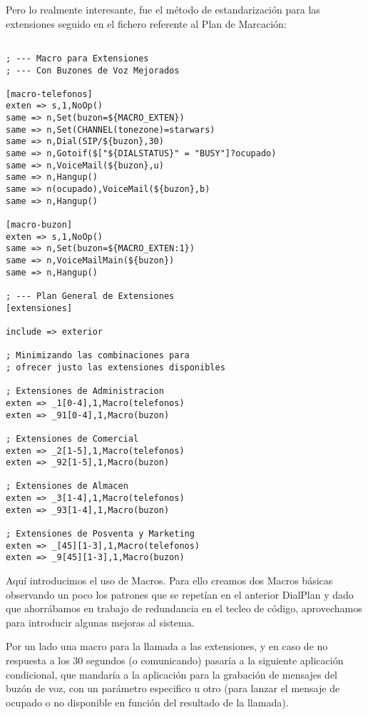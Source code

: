 Pero lo realmente interesante, fue el método de estandarización para las extensiones seguido en el fichero referente al Plan de Marcación:

\begin{lstlisting}[style=bash,title={/etc/asterisk/extensions.conf}]

; --- Macro para Extensiones
; --- Con Buzones de Voz Mejorados

[macro-telefonos]
exten => s,1,NoOp()
same => n,Set(buzon=${MACRO_EXTEN})
same => n,Set(CHANNEL(tonezone)=starwars)
same => n,Dial(SIP/${buzon},30)
same => n,Gotoif($["${DIALSTATUS}" = "BUSY"]?ocupado)
same => n,VoiceMail(${buzon},u)
same => n,Hangup()
same => n(ocupado),VoiceMail(${buzon},b)
same => n,Hangup()

[macro-buzon]
exten => s,1,NoOp()
same => n,Set(buzon=${MACRO_EXTEN:1})
same => n,VoiceMailMain(${buzon})
same => n,Hangup()

; --- Plan General de Extensiones
[extensiones]

include => exterior

; Minimizando las combinaciones para
; ofrecer justo las extensiones disponibles

; Extensiones de Administracion
exten => _1[0-4],1,Macro(telefonos)
exten => _91[0-4],1,Macro(buzon)

; Extensiones de Comercial
exten => _2[1-5],1,Macro(telefonos)
exten => _92[1-5],1,Macro(buzon)

; Extensiones de Almacen
exten => _3[1-4],1,Macro(telefonos)
exten => _93[1-4],1,Macro(buzon)

; Extensiones de Posventa y Marketing
exten => _[45][1-3],1,Macro(telefonos)
exten => _9[45][1-3],1,Macro(buzon)

\end{lstlisting}

Aquí introducimos el uso de Macros. Para ello creamos dos Macros básicas observando un poco los patrones que se repetían en el anterior DialPlan y dado que ahorrábamos en trabajo de redundancia en el tecleo de código, aprovechamos para introducir algunas mejoras al sistema.

Por un lado una macro para la llamada a las extensiones, y en caso de no respuesta a los 30 segundos (o comunicando) pasaría a la siguiente aplicación condicional, que mandaría a la aplicación para la grabación de mensajes del buzón de voz, con un parámetro especifico u otro (para lanzar el mensaje de ocupado o no disponible en función del resultado de la llamada).


